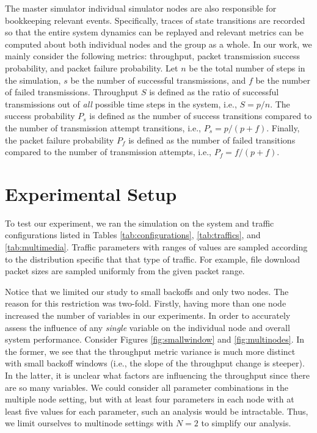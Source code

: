 \documentclass{llncs}
\begin{document}
The master simulator individual simulator nodes are also responsible for bookkeeping relevant events. Specifically, traces of state transitions are recorded so that the entire system dynamics can be replayed and relevant metrics can be computed about both individual nodes and the group as a whole. In our work, we mainly consider the following metrics: throughput, packet transmission success probability, and packet failure probability. Let $n$ be the total number of steps in the simulation, $s$ be the number of successful transmissions, and $f$ be the number of failed transmissions. Throughput $S$ is defined as the ratio of successful transmissions out of \emph{all} possible time steps in the system, i.e., $S = p / n$. The success probability $P_s$ is defined as the number of success transitions compared to the number of transmission attempt transitions, i.e., $P_s = p / (p + f)$. Finally, the packet failure probability $P_f$ is defined as the number of failed transitions compared to the number of transmission attempts, i.e., $P_f = f / (p + f)$. 

\section{Experimental Setup} \label{sec:experiment}
To test our experiment, we ran the simulation on the system and traffic configurations listed in Tables \ref{tab:configurations}, \ref{tab:traffics}, and \ref{tab:multimedia}. Traffic parameters with ranges of values are sampled according to the distribution specific that that type of traffic. For example, file download packet sizes are sampled uniformly from the given packet range. 

Notice that we limited our study to small backoffs and only two nodes. The reason for this restriction was two-fold. Firstly, having more than one node increased the number of variables in our experiments. In order to accurately assess the influence of any \emph{single} variable on the individual node and overall system performance. Consider Figures \ref{fig:smallwindow} and \ref{fig:multinodes}. In the former, we see that the throughput metric variance is much more distinct with small backoff windows (i.e., the slope of the throughput change is steeper). In the latter, it is unclear what factors are influencing the throughput since there are so many variables. We could consider all parameter combinations in the multiple node setting, but with at least four parameters in each node with at least five values for each parameter, such an analysis would be intractable. Thus, we limit ourselves to multinode settings with $N = 2$ to simplify our analysis. 
\end{document}
